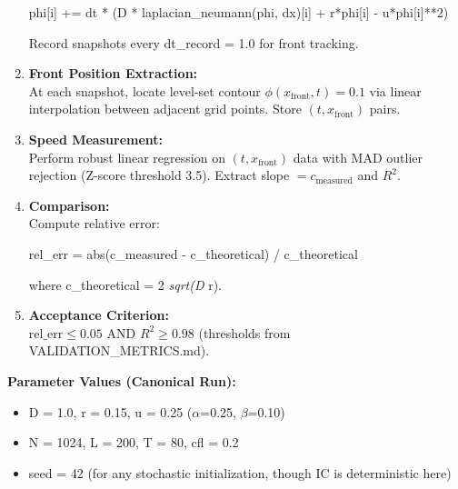 \documentclass[
]{article}
\newenvironment{Shaded}{}{}
\newcommand{\BuiltInTok}[1]{\textcolor[rgb]{0.00,0.50,0.00}{#1}}
\newcommand{\DecValTok}[1]{\textcolor[rgb]{0.25,0.63,0.44}{#1}}
\newcommand{\NormalTok}[1]{#1}
\newcommand{\OperatorTok}[1]{\textcolor[rgb]{0.40,0.40,0.40}{#1}}
\providecommand{\tightlist}{%
  \setlength{\itemsep}{0pt}\setlength{\parskip}{0pt}}
\begin{document}
\begin{enumerate}
\begin{Shaded}
\begin{Highlighting}[]
\NormalTok{phi[i] }\OperatorTok{+=}\NormalTok{ dt }\OperatorTok{*}\NormalTok{ (D }\OperatorTok{*}\NormalTok{ laplacian\_neumann(phi, dx)[i] }\OperatorTok{+}\NormalTok{ r}\OperatorTok{*}\NormalTok{phi[i] }\OperatorTok{{-}}\NormalTok{ u}\OperatorTok{*}\NormalTok{phi[i]}\OperatorTok{**}\DecValTok{2}\NormalTok{)}
\end{Highlighting}
\end{Shaded}

  Record snapshots every dt\_record = 1.0 for front tracking.
\item
  \textbf{Front Position Extraction:}\\
  At each snapshot, locate level-set contour
  \(\phi(x_{\text{front}}, t) = 0.1\) via linear interpolation between
  adjacent grid points. Store \((t, x_{\text{front}})\) pairs.
\item
  \textbf{Speed Measurement:}\\
  Perform robust linear regression on \((t, x_{\text{front}})\) data
  with MAD outlier rejection (Z-score threshold 3.5). Extract slope
  \(= c_{\text{measured}}\) and \(R^{2}\).
\item
  \textbf{Comparison:}\\
  Compute relative error:

\begin{Shaded}
\begin{Highlighting}[]
\NormalTok{rel\_err }\OperatorTok{=} \BuiltInTok{abs}\NormalTok{(c\_measured }\OperatorTok{{-}}\NormalTok{ c\_theoretical) }\OperatorTok{/}\NormalTok{ c\_theoretical}
\end{Highlighting}
\end{Shaded}

  where c\_theoretical = 2 \emph{sqrt(D} r).
\item
  \textbf{Acceptance Criterion:}\\
  \(\mathrm{rel\_err} \le 0.05\) AND \(R^{2} \ge 0.98\) (thresholds from
  VALIDATION\_METRICS.md).
\end{enumerate}

\textbf{Parameter Values (Canonical Run):}

\begin{itemize}
\tightlist
\item
  D = 1.0, r = 0.15, u = 0.25 ($\alpha$=0.25, $\beta$=0.10)
\item
  N = 1024, L = 200, T = 80, cfl = 0.2
\item
  seed = 42 (for any stochastic initialization, though IC is
  deterministic here)
\end{itemize}
\end{document}
